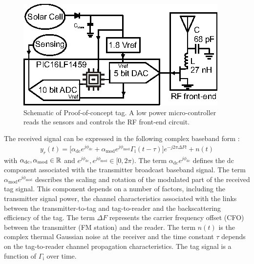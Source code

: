 \documentclass[journal]{IEEEtran}
\begin{document}
\begin{figure}[t]
\centering
\includegraphics[width=0.7\columnwidth]{Figures/Fig3.eps}
\caption{Schematic  of Proof-of-concept tag. A low power micro-controller reads the sensors and controls the RF front-end circuit.}
\label{fig:shem_tag}
\end{figure}
%
%
%
The  received signal can be expressed in the following complex baseband form \cite{daskalakis2017ambient}:
%
%
\begin{align}
\label{eq:yr}
y_r(t)=\big[ \alpha_{\text{dc}}e^{j\phi_{\text{dc}}}+\alpha_{\text{mod}}e^{j\phi_{\text{mod}}}  
\Gamma_\text{i} (t-\tau)\big]e^{-j2\pi\Delta F t} +n(t)
\end{align}
%
with  $\alpha_{\text{dc}}, \alpha_{\text{mod}}  \in 
{\Bbb R} $  and $e^{j\phi_{\text{dc}}}, e^{j\phi_{\text{mod}}} \in  [0, 2\pi)$.
%
The term $\alpha_{\text{dc}}e^{j\phi_{\text{dc}}}$
defines the dc component associated with the transmitter broadcast baseband signal.
% 
The term  $\alpha_{\text{mod}}e^{j\phi_{\text{mod}}}$  describes the scaling and rotation of the modulated  part  of the received  tag signal.
%
This component depends on a number of factors, including the  transmitter signal power, the channel characteristics associated with the links between the  transmitter-to-tag and tag-to-reader and the backscattering efficiency of the tag.  
%
The term $\Delta F$ represents the carrier frequency offset (CFO) between the transmitter (FM station) and the reader.
%
The term $n(t)$ is the complex thermal Gaussian noise at the receiver and the time constant $\tau$  depends on the tag-to-reader channel propagation characteristics. 
%
The tag signal is  a  function of $\Gamma_\text{i}$ over time.
\end{document}
